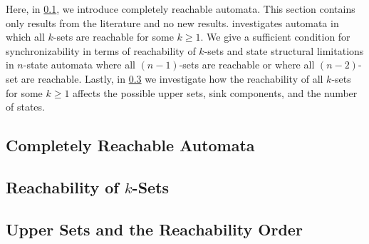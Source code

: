
Here, in \cref{sync_max:sec:compl_reach}, we introduce completely reachable automata.
This section contains only results from the literature and no new results.
investigates automata in which all $k$-sets
are reachable for some $k \ge 1$.
We give a sufficient condition for synchronizability
in terms of reachability of $k$-sets
and state structural limitations
in $n$-state automata where all $(n-1)$-sets are reachable
or where all $(n - 2)$-set are reachable. 
Lastly, in \cref{sync_max:sec:upper-sets} we investigate
how the reachability of all $k$-sets for some $k \ge 1$
affects the possible upper sets, sink components,
and the number of states.




\subsection{Completely Reachable Automata}
\label{sync_max:sec:compl_reach}



\subsection{Reachability of \texorpdfstring{$k$}{k}-Sets}
\label{sync_max:sec:reach_k-sets}



\subsection{Upper Sets and the Reachability Order} %
\label{sync_max:sec:upper-sets}


